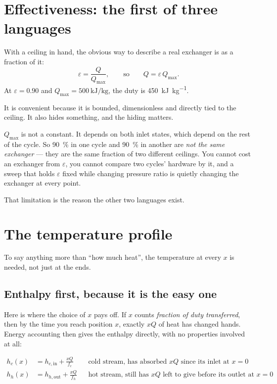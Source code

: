 \documentclass[11pt,a4paper]{report}
\begin{document}
\section{Effectiveness: the first of three languages}

With a ceiling in hand, the obvious way to describe a real exchanger is as a
fraction of it:
\[
  \varepsilon = \frac{Q}{Q_{\max}}, \qquad\text{so}\qquad
  Q = \varepsilon\, Q_{\max}.
\]
At $\varepsilon = 0.90$ and $Q_{\max} = \SI{500}{\kilo\joule\per\kilogram}$,
the duty is \SI{450}{\kilo\joule\per\kilogram}.

It is convenient because it is bounded, dimensionless and directly tied to
the ceiling. It also hides something, and the hiding matters.

$Q_{\max}$ is not a constant. It depends on both inlet states, which depend
on the rest of the cycle. So \SI{90}{\percent} in one cycle and
\SI{90}{\percent} in another are \emph{not the same exchanger} --- they are
the same fraction of two different ceilings. You cannot cost an exchanger
from $\varepsilon$, you cannot compare two cycles' hardware by it, and a
sweep that holds $\varepsilon$ fixed while changing pressure ratio is
quietly changing the exchanger at every point.

That limitation is the reason the other two languages exist.

\section{The temperature profile}

To say anything more than ``how much heat'', the temperature at every $x$ is
needed, not just at the ends.

\subsection{Enthalpy first, because it is the easy one}

Here is where the choice of $x$ pays off. If $x$ counts \emph{fraction of
duty transferred}, then by the time you reach position $x$, exactly $xQ$ of
heat has changed hands. Energy accounting then gives the enthalpy directly,
with no properties involved at all:

\begin{align*}
  h_c(x) &= h_{c,\mathrm{in}} + \frac{xQ}{f_c}
         &&\text{cold stream, has absorbed $xQ$ since its inlet at $x=0$}\\
  h_h(x) &= h_{h,\mathrm{out}} + \frac{xQ}{f_h}
         &&\text{hot stream, still has $xQ$ left to give before its outlet at $x=0$}
\end{align*}
\end{document}
